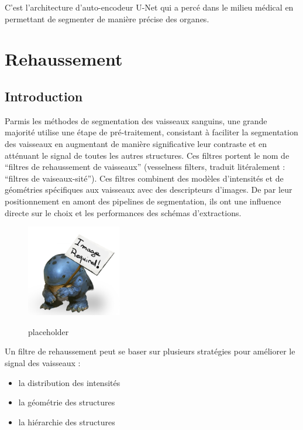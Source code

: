 C'est l'architecture d'auto-encodeur U-Net qui a percé dans le milieu médical en permettant de segmenter de manière précise des organes.


\section{Rehaussement}
\label{sec:EA:rehaussement}
\subsection{Introduction}
\label{sec:EA:rehaussement:introduction}

Parmis les méthodes de segmentation des vaisseaux sanguins, une grande majorité utilise une étape de pré-traitement, consistant à faciliter la segmentation des vaisseaux en augmentant de manière significative leur contraste et en atténuant le signal de toutes les autres structures. Ces filtres portent le nom de ``filtres de rehaussement de vaisseaux'' (vesselness filters, traduit litéralement : ``filtres de vaiseaux-sité''). Ces filtres combinent des modèles d'intensités et de géométries spécifiques aux vaisseaux avec des descripteurs d'images. De par leur positionnement en amont des pipelines de segmentation, ils ont une influence directe sur le choix et les performances des schémas d'extractions.

\begin{figure}
  \centering
  \includegraphics[height=4cm]{Images/img_required.jpg}
  \label{fig:placeholder}
  \caption{placeholder}
\end{figure}

Un filtre de rehaussement peut se baser sur plusieurs stratégies pour améliorer le signal des vaisseaux :

\begin{itemize}
\item la distribution des intensités
\item la géométrie des structures
\item la hiérarchie des structures
\end{itemize}

